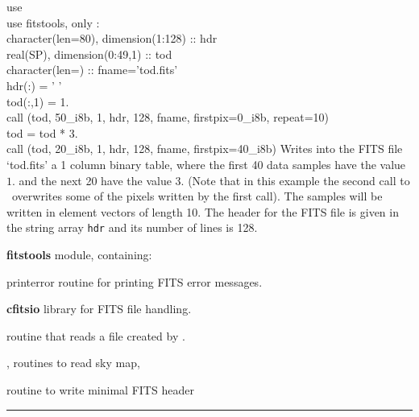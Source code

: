 \begin{example}
{
use  \\
use fitstools, only : \thedocid \\
character(len=80), dimension(1:128) :: hdr \\
real(SP), dimension(0:49,1) :: tod \\
character(len=) :: fname='tod.fits' \\
hdr(:) = ' ' \\
tod(:,1) = 1. \\
call \thedocid (tod, 50\_i8b, 1, hdr, 128, fname, firstpix=0\_i8b, repeat=10)  \\
tod = tod * 3. \\
call \thedocid (tod, 20\_i8b, 1, hdr, 128, fname, firstpix=40\_i8b)  
}
{
Writes into the FITS file `tod.fits' a 1 column binary table, where the first 40
data samples have the value $1.$ and the next 20 have the value $3.$ (Note that
in this example the
second call to \thedocid \ overwrites some of the pixels written by the first call). The samples will be
written in element vectors of length 10. The header for the FITS file is given in the
string array {\tt hdr} and its number of lines is 128. 
}
\end{example}

\begin{modules}
  \begin{sulist}{} %
  \item[\textbf{fitstools}] module, containing:
  \item[printerror] routine for printing FITS error messages.
  \item[\textbf{cfitsio}] library for FITS file handling.		
  \end{sulist}
\end{modules}

\begin{related}
  \begin{sulist}{} %
  \item[\htmlref{input\_tod*}{sub:input_tod}] routine that reads a file created by \thedocid. 
  \item[\htmlref{input\_map}{sub:input_map},
  \htmlref{read\_bintab}{sub:read_bintab}] routines to read \healpix sky map,
  \item[\htmlref{write\_minimal\_header}{sub:write_minimal_header}] routine to write minimal FITS header
  \end{sulist}
\end{related}

\rule{\hsize}{2mm}

\newpage
